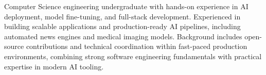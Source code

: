 Computer Science engineering undergraduate with hands-on experience in AI deployment, model fine-tuning, and full-stack development. Experienced in building scalable applications and production-ready AI pipelines, including automated news engines and medical imaging models. Background includes open-source contributions and technical coordination within fast-paced production environments, combining strong software engineering fundamentals with practical expertise in modern AI tooling.
